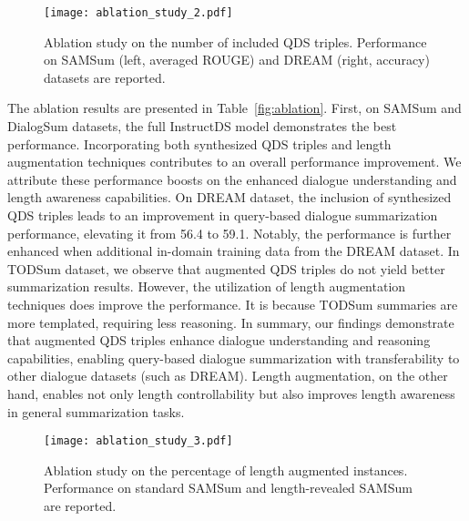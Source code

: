 \documentclass[11pt]{article}
\begin{document}
\begin{figure}[tb]
            \centering
             \texttt{[image: ablation\_study\_2.pdf]}
            \caption{Ablation study on the number of included QDS triples. Performance on SAMSum (left, averaged ROUGE) and DREAM (right, accuracy) datasets are reported.}
            \label{fig:ablation2}
        \end{figure}


        The ablation results are presented in Table~\ref{fig:ablation}. First, on SAMSum and DialogSum datasets, the full InstructDS model demonstrates the best performance. Incorporating both synthesized QDS triples and length augmentation techniques contributes to an overall performance improvement. We attribute these performance boosts on the enhanced dialogue understanding and length awareness capabilities. On DREAM dataset, the inclusion of synthesized QDS triples leads to an improvement in query-based dialogue summarization performance, elevating it from 56.4 to 59.1. Notably, the performance is further enhanced when additional in-domain training data from the DREAM dataset. In TODSum dataset, we observe that augmented QDS triples do not yield better summarization results. However, the utilization of length augmentation techniques does improve the performance. It is because TODSum summaries are more templated, requiring less reasoning. In summary, our findings demonstrate that augmented QDS triples enhance dialogue understanding and reasoning capabilities, enabling query-based dialogue summarization with transferability to other dialogue datasets (such as DREAM). Length augmentation, on the other hand, enables not only length controllability but also improves length awareness in general summarization tasks.


\begin{figure}[tb]
            \centering
             \texttt{[image: ablation\_study\_3.pdf]}
            \caption{Ablation study on the percentage of length augmented instances. Performance on standard SAMSum and length-revealed SAMSum are reported. }
            \label{fig:ablation3}
        \end{figure}
\end{document}
